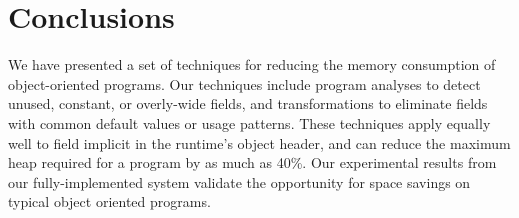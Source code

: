 \documentclass[oribibl]{llncs}
\begin{document}

\section{Conclusions}
%
We have presented a set of techniques for reducing the memory
consumption of object-oriented programs.  Our techniques include
program analyses to detect unused, constant, or overly-wide fields,
and transformations to eliminate fields with common default values
or usage patterns.  These techniques apply equally well to
field implicit in the runtime's object header, and can reduce the
maximum heap required for a program by as much as 40\%. 
Our experimental results from our fully-implemented system validate the
opportunity for space savings on typical object oriented programs.



%
\end{document}
